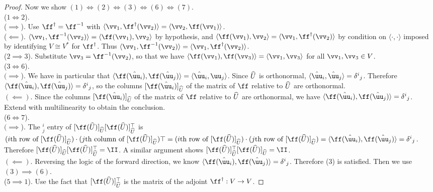 \begin{proof}
    Now we show $(1) \iff (2) \iff (3) \iff (6) \iff (7)$.
    \mbox{} \\
        ($1 \iff 2$).
        \\ \indent ($\implies$). Use $\ff^\dag = \ff^{-1}$ with $\langle \vv_1, \ff^\dag(\vv_2) \rangle = \langle \vv_2, \ff(\vv_1) \rangle$.
        \\ \indent($\impliedby$). $\langle \vv_1, \ff^{-1}(\vv_2) \rangle = \langle \ff(\vv_1), \vv_2 \rangle$ by hypothesis, and $\langle \ff(\vv_1), \vv_2 \rangle = \langle \vv_1, \ff^\dag(\vv_2) \rangle$ by condition on $\langle \cdot, \cdot \rangle$ imposed by identifying $V \cong V^*$ for $\ff^\dag$. Thus $\langle \vv_1, \ff^{-1}(\vv_2) \rangle = \langle \vv_1, \ff^\dag(\vv_2) \rangle$.
        \\ ($2 \implies 3$). Substitute $\vv_3 = \ff^{-1}(\vv_2)$, so that we have $\langle \ff(\vv_1), \ff(\vv_3) \rangle = \langle \vv_1, \vv_3 \rangle$ for all $\vv_1, \vv_3 \in V$.
        \\ ($3 \iff 6$). 
        \\ \indent $(\implies$). We have in particular that $\langle \ff(\huu_i), \ff(\huu_j) \rangle = \langle \huu_i, {\uu}_j \rangle$. Since $\widehat{U}$ is orthonormal, $\langle \huu_i, \huu_j \rangle = \delta^i{}_j$. Therefore $\langle \ff(\huu_i), \ff(\huu_j) \rangle = \delta^i{}_j$, so the columns $[\ff(\huu_i)]_{\hU}$ of the matrix of $\ff$ relative to $\widehat{U}$ are orthonormal.
        \\ \indent $(\impliedby)$. Since the columns $[\ff(\huu_i)]_{\hU}$ of the matrix of $\ff$ relative to $\widehat{U}$ are orthonormal, we have $\langle \ff(\huu_i), \ff(\huu_j) \rangle = \delta^i{}_j$. Extend with multilinearity to obtain the conclusion.
        \\ ($6 \iff 7$).
        \\ \indent $(\implies$). The $^i_j$ entry of $[\ff(\hU)]_{\hU} [\ff(\hU)]_{\hU}^\top$ is $(\text{$i$th row of $[\ff(\hU)]_{\hU}$}) \cdot (\text{$j$th column of $[\ff(\hU)]_{\hU}$})\top = (\text{$i$th row of $[\ff(\hU)]_{\hU}$}) \cdot (\text{$j$th row of $[\ff(\hU)]_{\hU}$}) = \langle \ff(\huu_i), \ff(\huu_j) \rangle = \delta^i{}_j$. Therefore $[\ff(\hU)]_{\hU} [\ff(\hU)]_{\hU}^\top = \II$. A similar argument shows $[\ff(\hU)]_{\hU}^\top [\ff(\hU)]_{\hU} = \II$.
        \\ \indent $(\impliedby)$. Reversing the logic of the forward direction, we know $\langle \ff(\huu_i), \ff(\huu_j) \rangle = \delta^i{}_j$. Therefore (3) is satisfied. Then we use $(3) \implies (6)$.
        \\ ($5 \implies 1$). Use the fact that $[\ff(\hU)]_{\hU}^\top$ is the matrix of the adjoint $\ff^\dag:V \rightarrow V$.
\end{proof}
